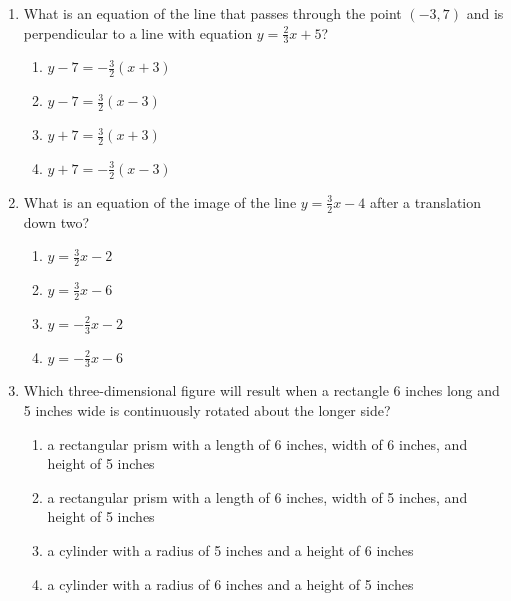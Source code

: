 \documentclass[12pt, twoside]{article}
\begin{document}
\begin{enumerate}
\item What is an equation of the line that passes through the point $(-3,7)$ and is perpendicular to a line with equation $y=\frac{2}{3}x+5$?
  \begin{multicols}{2}
    \begin{enumerate}
      \item $y-7=-\frac{3}{2}(x+3)$
      \item $y-7=\frac{3}{2}(x-3)$ 
      \item $y+7=\frac{3}{2}(x+3)$
      \item $y+7=-\frac{3}{2}(x-3)$
    \end{enumerate}
  \end{multicols}

\item What is an equation of the image of the line $y=\frac{3}{2}x-4$ after a translation down two?
\begin{multicols}{2}
  \begin{enumerate}
    \item $y=\frac{3}{2}x-2$
    \item $y=\frac{3}{2}x-6$
    \item $y=-\frac{2}{3}x-2$
    \item $y=-\frac{2}{3}x-6$
  \end{enumerate}
\end{multicols}

\item Which three-dimensional figure will result when a rectangle 6 inches long and 5 inches wide is continuously rotated about the longer side?
  \begin{enumerate}
    \item a rectangular prism with a length of 6 inches, width of 6 inches, and height of 5 inches
    \item a rectangular prism with a length of 6 inches, width of 5 inches, and height of 5 inches
    \item a cylinder with a radius of 5 inches and a height of 6 inches
    \item a cylinder with a radius of 6 inches and a height of 5 inches
  \end{enumerate}


\end{enumerate}
\end{document}
